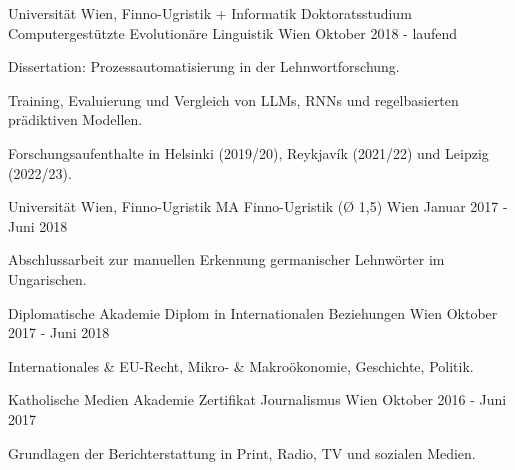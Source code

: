 

\begin{cventries}

  \cventry
    {Universität Wien, Finno-Ugristik + Informatik} %
    {Doktoratsstudium Computergestützte Evolutionäre Linguistik} %
    {Wien} %
    {Oktober 2018 - laufend} %
    {
      \begin{cvitems} %
        \item{Dissertation: Prozessautomatisierung in der Lehnwortforschung.}
        \item{Training, Evaluierung und Vergleich von LLMs, RNNs und regelbasierten prädiktiven Modellen.}
        \item{Forschungsaufenthalte in Helsinki (2019/20), Reykjavík (2021/22) und Leipzig (2022/23).}
      \end{cvitems}
    }

  \cventry
    {Universität Wien, Finno-Ugristik} %
    {MA Finno-Ugristik (Ø 1,5)} %
    {Wien} %
    {Januar 2017 - Juni 2018} %
    {
      \begin{cvitems} %
        \item {Abschlussarbeit zur manuellen Erkennung germanischer Lehnwörter im Ungarischen.}
      \end{cvitems}
    }

  \cventry
    {Diplomatische Akademie} %
    {Diplom in Internationalen Beziehungen} %
    {Wien} %
    {Oktober 2017 - Juni 2018} %
    {
    \begin{cvitems} %
        \item{Internationales \& EU-Recht, Mikro- \& Makroökonomie, Geschichte, Politik.}
      \end{cvitems}
    }

  \cventry
    {Katholische Medien Akademie} %
    {Zertifikat Journalismus} %
    {Wien} %
    {Oktober 2016 - Juni 2017} %
    {
    \begin{cvitems} %
        \item{Grundlagen der Berichterstattung in Print, Radio, TV und sozialen Medien.}
      \end{cvitems}
    }
       

\end{cventries}
